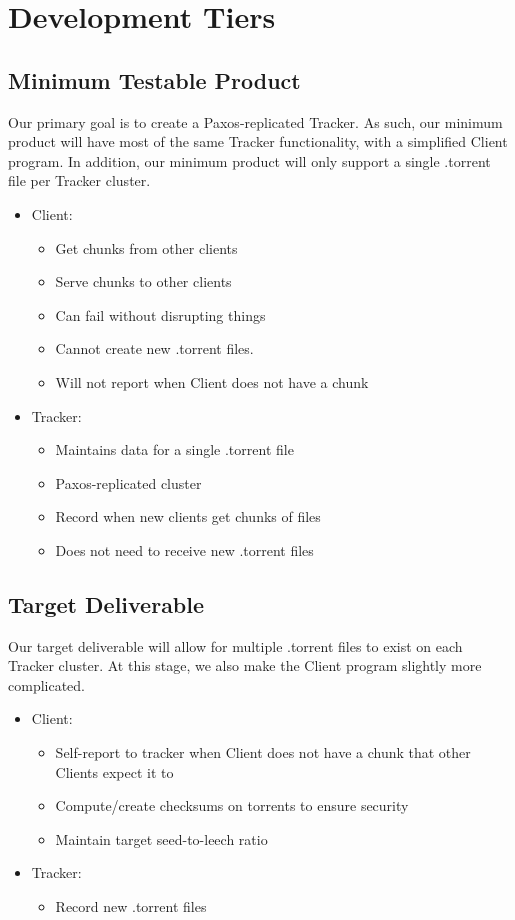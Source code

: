 \documentclass[12pt]{article}
\begin{document}
\section*{Development Tiers}

\subsection*{Minimum Testable Product}
Our primary goal is to create a Paxos-replicated Tracker.
As such, our minimum product will have most of the same Tracker functionality,
with a simplified Client program.
In addition, our minimum product will only support a single .torrent file per
Tracker cluster.

\begin{itemize}
\item  Client:
    \begin{itemize}
    \item  Get chunks from other clients
    \item  Serve chunks to other clients
    \item  Can fail without disrupting things
    \item  Cannot create new .torrent files.
    \item  Will not report when Client does not have a chunk
    \end{itemize}
\item  Tracker:
    \begin{itemize}
    \item  Maintains data for a single .torrent file
    \item  Paxos-replicated cluster
    \item  Record when new clients get chunks of files
    \item  Does not need to receive new .torrent files
    \end{itemize}
\end{itemize}

\subsection*{Target Deliverable}
Our target deliverable will allow for multiple .torrent files to exist on
each Tracker cluster.
At this stage, we also make the Client program slightly more complicated.

\begin{itemize}
\item  Client:
    \begin{itemize}
    \item  Self-report to tracker when Client does not have a chunk that other
           Clients expect it to
    \item  Compute/create checksums on torrents to ensure security
    \item  Maintain target seed-to-leech ratio
    \end{itemize}
\item  Tracker:
    \begin{itemize}
    \item  Record new .torrent files
    \end{itemize}
\end{itemize}
\end{document}
